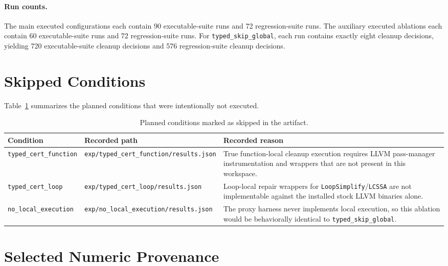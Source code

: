 \documentclass{article}
\begin{document}
\paragraph{Run counts.}
The main executed configurations each contain 90 executable-suite runs and 72 regression-suite runs. The auxiliary executed ablations each contain 60 executable-suite runs and 72 regression-suite runs. For \texttt{typed\_skip\_global}, each run contains exactly eight cleanup decisions, yielding 720 executable-suite cleanup decisions and 576 regression-suite cleanup decisions.

\section{Skipped Conditions}
\label{app:skipped}

Table~\ref{tab:skipped} summarizes the planned conditions that were intentionally not executed.

\begin{table}[h]
\caption{Planned conditions marked as skipped in the artifact.}
\label{tab:skipped}
\centering
\small
\begin{tabular}{lll}
\toprule
Condition & Recorded path & Recorded reason \\
\midrule
\texttt{typed\_cert\_function} & \texttt{exp/typed\_cert\_function/results.json} &
True function-local cleanup execution requires LLVM pass-manager instrumentation and wrappers that are not present in this workspace. \\
\texttt{typed\_cert\_loop} & \texttt{exp/typed\_cert\_loop/results.json} &
Loop-local repair wrappers for \texttt{LoopSimplify}/\texttt{LCSSA} are not implementable against the installed stock LLVM binaries alone. \\
\texttt{no\_local\_execution} & \texttt{exp/no\_local\_execution/results.json} &
The proxy harness never implements local execution, so this ablation would be behaviorally identical to \texttt{typed\_skip\_global}. \\
\bottomrule
\end{tabular}
\end{table}

\section{Selected Numeric Provenance}
\label{app:numbers}
\end{document}
